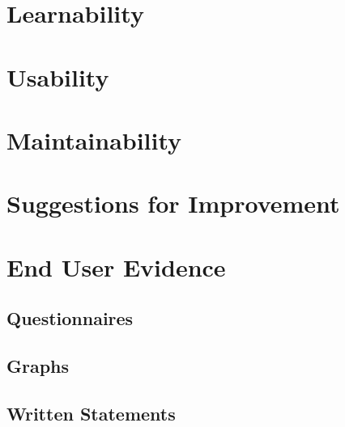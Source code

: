 \section{Learnability}

\section{Usability}

\section{Maintainability}

\section{Suggestions for Improvement}

\section{End User Evidence}

\subsection{Questionnaires}

\subsection{Graphs}

\subsection{Written Statements}
